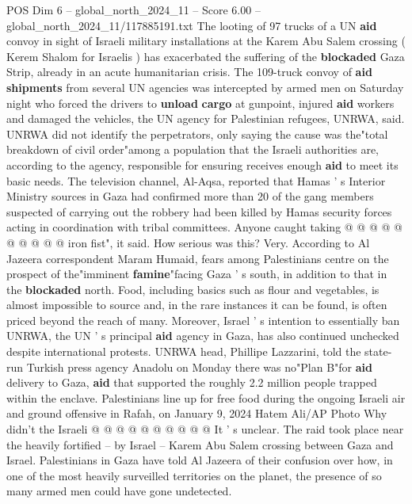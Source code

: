 \begin{textsample}{POS Dim 6 – global\_north\_2024\_11 – Score 6.00 – global\_north\_2024\_11/117885191.txt}  \label{ex:f6_pos_282}
The looting of 97 trucks of a UN \textbf{aid} convoy in sight of Israeli military installations at the Karem Abu Salem crossing ( Kerem Shalom for Israelis ) has exacerbated the suffering of the \textbf{blockaded} Gaza Strip, already in an acute humanitarian crisis.
The 109-truck convoy of \textbf{aid} \textbf{shipments} from several UN agencies was intercepted by armed men on Saturday night who forced the drivers to \textbf{unload} \textbf{cargo} at gunpoint, injured \textbf{aid} workers and damaged the vehicles, the UN agency for Palestinian refugees, UNRWA, said.
UNRWA did not identify the perpetrators, only saying the cause was the"total breakdown of civil order"among a population that the Israeli authorities are, according to the agency, responsible for ensuring receives enough \textbf{aid} to meet its basic needs.
The television channel, Al-Aqsa, reported that Hamas ' s Interior Ministry sources in Gaza had confirmed more than 20 of the gang members suspected of carrying out the robbery had been killed by Hamas security forces acting in coordination with tribal committees.
Anyone caught taking @ @ @ @ @ @ @ @ @ @ iron fist", it said.
How serious was this?
Very.
According to Al Jazeera correspondent Maram Humaid, fears among Palestinians centre on the prospect of the"imminent \textbf{famine}"facing Gaza ' s south, in addition to that in the \textbf{blockaded} north.
Food, including basics such as flour and vegetables, is almost impossible to source and, in the rare instances it can be found, is often priced beyond the reach of many.
Moreover, Israel ' s intention to essentially ban UNRWA, the UN ' s principal \textbf{aid} agency in Gaza, has also continued unchecked despite international protests.
UNRWA head, Phillipe Lazzarini, told the state-run Turkish press agency Anadolu on Monday there was no"Plan B"for \textbf{aid} delivery to Gaza, \textbf{aid} that supported the roughly 2.2 million people trapped within the enclave.
Palestinians line up for free food during the ongoing Israeli air and ground offensive in Rafah, on January 9, 2024 Hatem Ali/AP Photo Why didn't the Israeli @ @ @ @ @ @ @ @ @ @ It ' s unclear.
The raid took place near the heavily fortified -- by Israel -- Karem Abu Salem crossing between Gaza and Israel.
Palestinians in Gaza have told Al Jazeera of their confusion over how, in one of the most heavily surveilled territories on the planet, the presence of so many armed men could have gone undetected.

\end{textsample}
